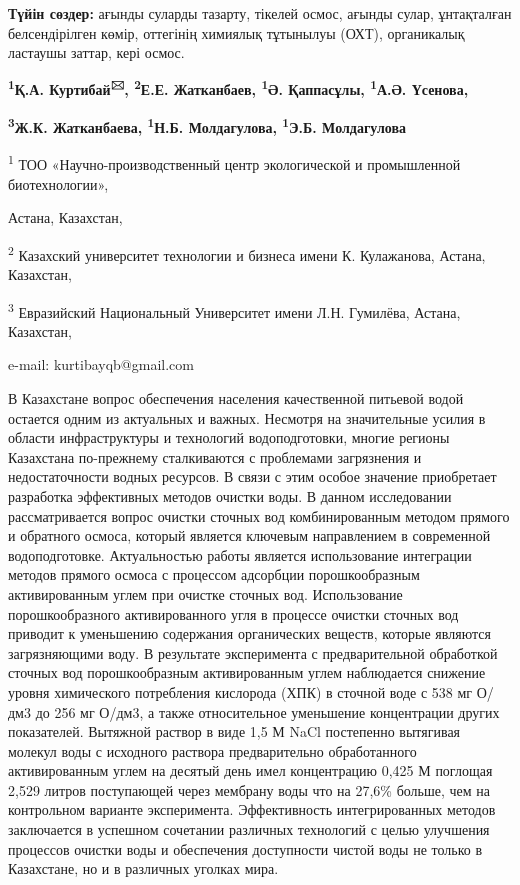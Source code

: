{\bfseries Түйін сөздер:} ағынды суларды тазарту, тікелей осмос, ағынды
сулар, ұнтақталған белсендірілген көмір, оттегінің химиялық тұтынылуы
(ОХТ), органикалық ластаушы заттар, кері осмос.


\begin{center}
{\bfseries \textsuperscript{1}Қ.А. Куртибай\textsuperscript{🖂},
\textsuperscript{2}Е.Е. Жатканбаев, \textsuperscript{1}Ә. Қаппасұлы,
\textsuperscript{1}А.Ә. Үсенова,}

{\bfseries \textsuperscript{3}Ж.К. Жатканбаева, \textsuperscript{1}Н.Б.
Молдагулова, \textsuperscript{1}Э.Б. Молдагулова}

\textsuperscript{1} ТОО «Научно-производственный центр экологической и
промышленной биотехнологии»,

Астана, Казахстан,

\textsuperscript{2} Казахский университет технологии и бизнеса имени К.
Кулажанова, Астана, Казахстан,

\textsuperscript{3} Евразийский Национальный Университет имени Л.Н.
Гумилёва, Астана, Казахстан,

e-mail: kurtibayqb@gmail.com
\end{center}

В Казахстане вопрос обеспечения населения качественной питьевой водой
остается одним из актуальных и важных. Несмотря на значительные усилия в
области инфраструктуры и технологий водоподготовки, многие регионы
Казахстана по-прежнему сталкиваются с проблемами загрязнения и
недостаточности водных ресурсов. В связи с этим особое значение
приобретает разработка эффективных методов очистки воды. В данном
исследовании рассматривается вопрос очистки сточных вод комбинированным
методом прямого и обратного осмоса, который является ключевым
направлением в современной водоподготовке. Актуальностью работы является
использование интеграции методов прямого осмоса с процессом адсорбции
порошкообразным активированным углем при очистке сточных вод.
Использование порошкообразного активированного угля в процессе очистки
сточных вод приводит к уменьшению содержания органических веществ,
которые являются загрязняющими воду. В результате эксперимента с
предварительной обработкой сточных вод порошкообразным активированным
углем наблюдается снижение уровня химического потребления кислорода
(ХПК) в сточной воде с 538 мг О/дм3 до 256 мг О/дм3, а также
относительное уменьшение концентрации других показателей. Вытяжной
раствор в виде 1,5 М NaCl постепенно вытягивая молекул воды с исходного
раствора предварительно обработанного активированным углем на десятый
день имел концентрацию 0,425 М поглощая 2,529 литров поступающей через
мембрану воды что на 27,6\% больше, чем на контрольном варианте
эксперимента. Эффективность интегрированных методов заключается в
успешном сочетании различных технологий с целью улучшения процессов
очистки воды и обеспечения доступности чистой воды не только в
Казахстане, но и в различных уголках мира.

